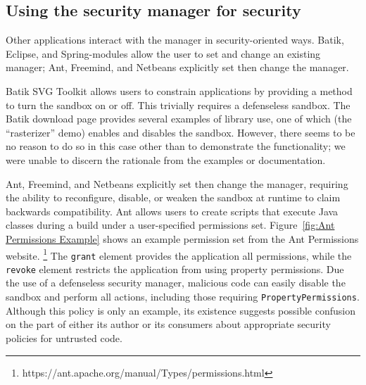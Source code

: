 \documentclass{sig-alternate}
\begin{document}
\subsection{Using the security manager for security}
\label{sub:Using-the-Security}

Other applications interact with the manager in
security-oriented ways. %
Batik,
Eclipse, and Spring-modules
allow the user to set and change an existing manager;
Ant, Freemind, and Netbeans explicitly set then change the manager.

Batik SVG Toolkit allows users to constrain applications
by providing a method to turn the sandbox on or off. 
This trivially
requires a defenseless sandbox. The Batik download page
provides several examples of library use, one of which (the
``rasterizer'' demo) enables and disables the sandbox.  However, there seems to
be no reason to do so in this case other than to demonstrate the functionality;
we were unable to discern the rationale from the examples or
documentation.


Ant, Freemind, and Netbeans explicitly set then change the manager,
requiring the ability to reconfigure, disable,
or weaken the sandbox at runtime to claim backwards
compatibility. Ant allows users to create scripts that 
execute Java classes during a build under a user-specified
permissions set. Figure~\ref{fig:Ant Permissions Example}
shows an example permission set from the Ant Permissions website.%
\footnote{https://ant.apache.org/manual/Types/permissions.html%
} The \texttt{grant} element provides the application
all permissions, while the \texttt{revoke} element restricts
the application from using property permissions. Due the use of a
defenseless security manager, malicious code can easily disable the sandbox and perform all actions,
including those requiring \texttt{PropertyPermissions}.  Although this policy is
only an example, its existence suggests possible confusion on the part of either its author
or its consumers about appropriate security policies for untrusted code.
\end{document}
